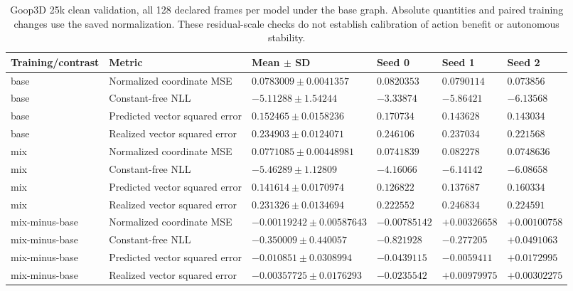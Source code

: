 \begin{table}[p]
\centering\scriptsize
\caption{Goop3D 25k clean validation, all 128 declared frames per model under the base graph. Absolute quantities and paired training changes use the saved normalization. These residual-scale checks do not establish calibration of action benefit or autonomous stability.}
\label{tab:goop3d25k-clean}
\setlength{\tabcolsep}{3pt}
\begin{tabular}{llllll}
\toprule
Training/contrast & Metric & Mean $\pm$ SD & Seed 0 & Seed 1 & Seed 2\\
\midrule
base & Normalized coordinate MSE & $0.0783009\pm0.0041357$ & $0.0820353$ & $0.0790114$ & $0.073856$\\
base & Constant-free NLL & $-5.11288\pm1.54244$ & $-3.33874$ & $-5.86421$ & $-6.13568$\\
base & Predicted vector squared error & $0.152465\pm0.0158236$ & $0.170734$ & $0.143628$ & $0.143034$\\
base & Realized vector squared error & $0.234903\pm0.0124071$ & $0.246106$ & $0.237034$ & $0.221568$\\
mix & Normalized coordinate MSE & $0.0771085\pm0.00448981$ & $0.0741839$ & $0.082278$ & $0.0748636$\\
mix & Constant-free NLL & $-5.46289\pm1.12809$ & $-4.16066$ & $-6.14142$ & $-6.08658$\\
mix & Predicted vector squared error & $0.141614\pm0.0170974$ & $0.126822$ & $0.137687$ & $0.160334$\\
mix & Realized vector squared error & $0.231326\pm0.0134694$ & $0.222552$ & $0.246834$ & $0.224591$\\
mix-minus-base & Normalized coordinate MSE & $-0.00119242\pm0.00587643$ & $-0.00785142$ & $+0.00326658$ & $+0.00100758$\\
mix-minus-base & Constant-free NLL & $-0.350009\pm0.440057$ & $-0.821928$ & $-0.277205$ & $+0.0491063$\\
mix-minus-base & Predicted vector squared error & $-0.010851\pm0.0308994$ & $-0.0439115$ & $-0.0059411$ & $+0.0172995$\\
mix-minus-base & Realized vector squared error & $-0.00357725\pm0.0176293$ & $-0.0235542$ & $+0.00979975$ & $+0.00302275$\\
\bottomrule
\end{tabular}
\end{table}
